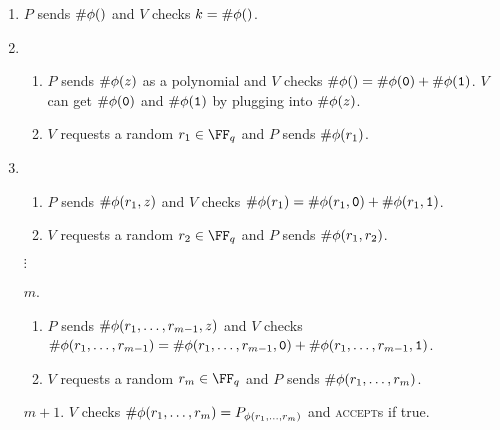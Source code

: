 \documentclass{standalone}
\begin{document}
\begin{enumerate}[start=0, nosep]
  \item \(P\) sends \(\textsf\#\phi()\) and \(V\) checks \(k = \textsf\#\phi()\).

  \item \begin{enumerate}
    \item \(P\) sends \(\textsf\#\phi(z)\) as a polynomial and
          \(V\) checks \(\textsf\#\phi() = \textsf\#\phi(\texttt 0) + \textsf\#\phi(\texttt 1)\).
          \(V\) can get \(\textsf\#\phi(\mathtt 0)\) and \(\textsf\#\phi(\mathtt 1)\)
          by plugging into \(\textsf\#\phi(z)\).

    \item \(V\) requests a random \(r_1 \in \FF_q\) and
          \(P\) sends \(\textsf\#\phi(r_1)\).
  \end{enumerate}

  \item \begin{enumerate}
    \item \(P\) sends \(\textsf\#\phi(r_1, z)\) and
          \(V\) checks \(\textsf\#\phi(r_1) = \textsf\#\phi(r_1, \texttt 0) +
                                        \textsf\#\phi(r_1, \texttt 1)\).

    \item \(V\) requests a random \(r_2 \in \FF_q\) and
          \(P\) sends \(\textsf\#\phi(r_1, r_2)\).
  \end{enumerate}

  \item[\(\vdots\)]

  \item[\(m\).] \begin{enumerate}
    \item \(P\) sends \(\textsf\#\phi(r_1, \dots, r_{m - 1}, z)\) and
          \(V\) checks \(\textsf\#\phi(r_1, \dots, r_{m - 1}) =
                \textsf\#\phi(r_1, \dots, r_{m - 1}, \texttt 0) +
                \textsf\#\phi(r_1, \dots, r_{m - 1}, \texttt 1)\).

    \item \(V\) requests a random \(r_m \in \FF_q\) and
          \(P\) sends \(\textsf\#\phi(r_1, \dots, r_m)\).
  \end{enumerate}

  \item[\(m + 1\).] \(V\) checks
                    \(\textsf\#\phi(r_1, \dots, r_m) = P_{\phi(r_1, \dots, r_m)}\)
                    and \textsc{accept}s if true.
\end{enumerate}
\end{document}
